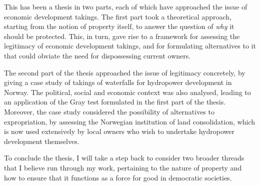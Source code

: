 This has been a thesis in two parts, each of which have approached the issue of economic development takings. The first part took a theoretical approach, starting from the notion of property itself, to answer the question of {\it why} it should be protected. This, in turn, gave rise to a framework for assessing the legitimacy of economic development takings, and for formulating alternatives to it that could obviate the need for dispossessing current owners.

The second part of the thesis approached the issue of legitimacy concretely, by giving a case study of takings of waterfalls for hydropower development in Norway. The political, social and economic context was also analysed, leading to an application of the Gray test formulated in the first part of the thesis. Moreover, the case study considered the possibility of alternatives to expropriation, by assessing the Norwegian institution of land consolidation, which is now used extensively by local owners who wish to undertake hydropower development themselves.




To conclude the thesis, I will take a step back to consider two broader threads that I believe run through my work, pertaining to the nature of property and how to ensure that it functions as a force for good in democratic societies.


